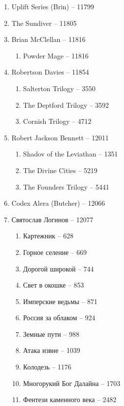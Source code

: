 \documentclass[a4paper, 11pt]{proc} %
\begin{document}
\begin{enumerate}
\begin{enumerate}
        \end{enumerate}
    \item Uplift Series (Brin) -- 11799
    \item The Sundiver -- 11805
    \item Brian McClellan -- 11816
        \begin{enumerate}
            \item Powder Mage -- 11816
        \end{enumerate}
    \item Robertson Davies -- 11854
        \begin{enumerate}
            \item Salterton Trilogy -- 3550
            \item The Deptford Trilogy -- 3592
            \item Cornish Trilogy -- 4712
        \end{enumerate}
    \item Robert Jackson Bennett -- 12011
        \begin{enumerate}
            \item Shadov of the Leviathan -- 1351
            \item The Divine Cities -- 5219
            \item The Founders Trilogy -- 5441
        \end{enumerate}
    \item Codex Alera (Butcher) -- 12066
    \item Святослав Логинов -- 12077
        \begin{enumerate}
            \item Картежник -- 628
            \item Горное селение -- 669
            \item Дорогой широкой -- 744
            \item Свет в окошке -- 853
            \item Имперские ведьмы -- 871
            \item Россия за облаком -- 924
            \item Земные пути -- 988
            \item Атака извне -- 1039
            \item Колодезь -- 1176
            \item Многорукий Бог Далайна -- 1703
            \item Фентези каменного века -- 2482
        \end{enumerate}

\end{enumerate}
\end{document}
